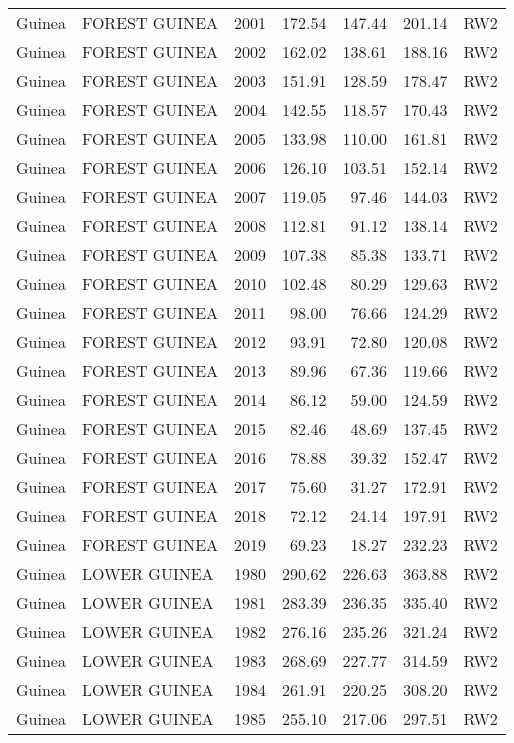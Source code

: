 \begin{longtable}{lllrrrl}
  Guinea & FOREST GUINEA & 2001 & 172.54 & 147.44 & 201.14 & RW2 \\ 
  Guinea & FOREST GUINEA & 2002 & 162.02 & 138.61 & 188.16 & RW2 \\ 
  Guinea & FOREST GUINEA & 2003 & 151.91 & 128.59 & 178.47 & RW2 \\ 
  Guinea & FOREST GUINEA & 2004 & 142.55 & 118.57 & 170.43 & RW2 \\ 
  Guinea & FOREST GUINEA & 2005 & 133.98 & 110.00 & 161.81 & RW2 \\ 
  Guinea & FOREST GUINEA & 2006 & 126.10 & 103.51 & 152.14 & RW2 \\ 
  Guinea & FOREST GUINEA & 2007 & 119.05 & 97.46 & 144.03 & RW2 \\ 
  Guinea & FOREST GUINEA & 2008 & 112.81 & 91.12 & 138.14 & RW2 \\ 
  Guinea & FOREST GUINEA & 2009 & 107.38 & 85.38 & 133.71 & RW2 \\ 
  Guinea & FOREST GUINEA & 2010 & 102.48 & 80.29 & 129.63 & RW2 \\ 
  Guinea & FOREST GUINEA & 2011 & 98.00 & 76.66 & 124.29 & RW2 \\ 
  Guinea & FOREST GUINEA & 2012 & 93.91 & 72.80 & 120.08 & RW2 \\ 
  Guinea & FOREST GUINEA & 2013 & 89.96 & 67.36 & 119.66 & RW2 \\ 
  Guinea & FOREST GUINEA & 2014 & 86.12 & 59.00 & 124.59 & RW2 \\ 
  Guinea & FOREST GUINEA & 2015 & 82.46 & 48.69 & 137.45 & RW2 \\ 
  Guinea & FOREST GUINEA & 2016 & 78.88 & 39.32 & 152.47 & RW2 \\ 
  Guinea & FOREST GUINEA & 2017 & 75.60 & 31.27 & 172.91 & RW2 \\ 
  Guinea & FOREST GUINEA & 2018 & 72.12 & 24.14 & 197.91 & RW2 \\ 
  Guinea & FOREST GUINEA & 2019 & 69.23 & 18.27 & 232.23 & RW2 \\ 
  Guinea & LOWER GUINEA & 1980 & 290.62 & 226.63 & 363.88 & RW2 \\ 
  Guinea & LOWER GUINEA & 1981 & 283.39 & 236.35 & 335.40 & RW2 \\ 
  Guinea & LOWER GUINEA & 1982 & 276.16 & 235.26 & 321.24 & RW2 \\ 
  Guinea & LOWER GUINEA & 1983 & 268.69 & 227.77 & 314.59 & RW2 \\ 
  Guinea & LOWER GUINEA & 1984 & 261.91 & 220.25 & 308.20 & RW2 \\ 
  Guinea & LOWER GUINEA & 1985 & 255.10 & 217.06 & 297.51 & RW2 \\ 

\end{longtable}

